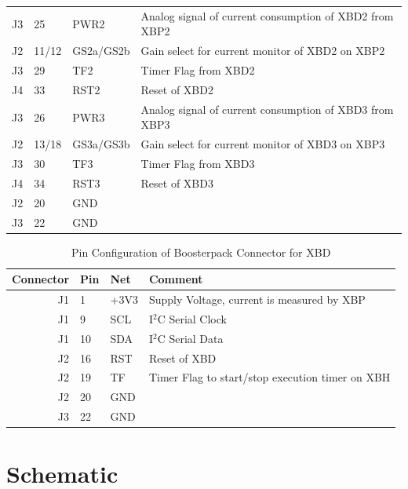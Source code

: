 \documentclass[twoside,11pt]{cergdoc}
\begin{document}
\begin{appendix}
\begin{table}[ht]
\begin{center}
\begin{tabular}{rlll}
       J3 & 25 & PWR2      & Analog signal of current consumption of XBD2 from XBP2 \\
       J2 & 11/12 & GS2a/GS2b & Gain select for current monitor of XBD2 on XBP2\\
       J3 & 29 & TF2       & Timer Flag from XBD2 \\
       J4 & 33 & RST2      & Reset of XBD2 \\ \hline

       J3 & 26 & PWR3      & Analog signal of current consumption of XBD3 from XBP3 \\
       J2 & 13/18 & GS3a/GS3b & Gain select for current monitor of XBD3 on XBP3\\
       J3 & 30 & TF3       & Timer Flag from XBD3 \\
       J4 & 34 & RST3      & Reset of XBD3 \\ \hline

       J2 & 20 & GND       & \\
       J3 & 22 & GND       & \\ \hline
    \end{tabular}
  \end{center}
\end{table}
\begin{table}[ht]
  \begin{center}
    \caption{Pin Configuration of Boosterpack Connector for XBD}
    \begin{tabular}{rlll}
      Connector & Pin  & Net         & Comment  \\ \hline
       J1 & 1  & +3V3      & Supply Voltage, current is measured by XBP \\
       J1 & 9  & SCL       & I$^2$C Serial Clock  \\
       J1 & 10 & SDA       & I$^2$C Serial Data \\
       J2 & 16 & RST       & Reset of XBD \\ 
       J2 & 19 & TF        & Timer Flag to start/stop execution timer on XBH \\
       J2 & 20 & GND       & \\
       J3 & 22 & GND       & \\ \hline
    \end{tabular}
  \end{center}
\end{table}

\chapter{Schematic}\label{sec:schematic}


\end{appendix}
\end{document}
